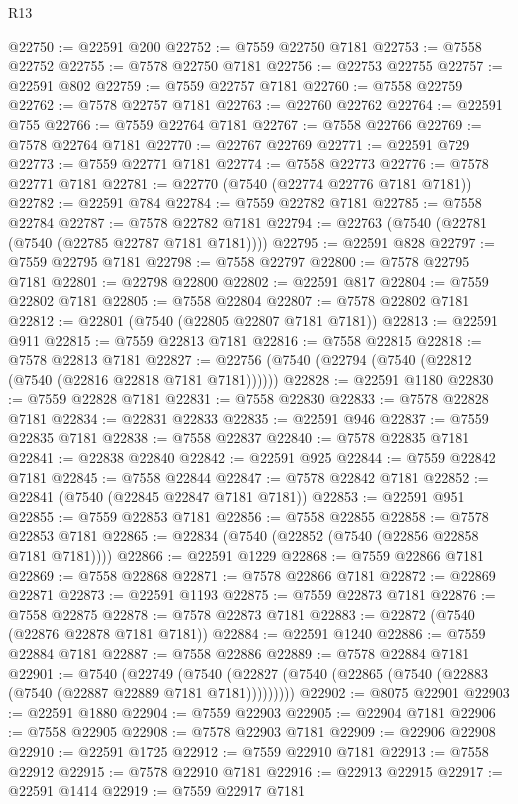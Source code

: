 \begin{lexlean}{R13}
\begin{coremodule}
@22750 := @22591 @200
@22752 := @7559 @22750 @7181
@22753 := @7558 @22752
@22755 := @7578 @22750 @7181
@22756 := @22753 @22755
@22757 := @22591 @802
@22759 := @7559 @22757 @7181
@22760 := @7558 @22759
@22762 := @7578 @22757 @7181
@22763 := @22760 @22762
@22764 := @22591 @755
@22766 := @7559 @22764 @7181
@22767 := @7558 @22766
@22769 := @7578 @22764 @7181
@22770 := @22767 @22769
@22771 := @22591 @729
@22773 := @7559 @22771 @7181
@22774 := @7558 @22773
@22776 := @7578 @22771 @7181
@22781 := @22770 (@7540 (@22774 @22776 @7181 @7181))
@22782 := @22591 @784
@22784 := @7559 @22782 @7181
@22785 := @7558 @22784
@22787 := @7578 @22782 @7181
@22794 := @22763 (@7540 (@22781 (@7540 (@22785 @22787 @7181 @7181))))
@22795 := @22591 @828
@22797 := @7559 @22795 @7181
@22798 := @7558 @22797
@22800 := @7578 @22795 @7181
@22801 := @22798 @22800
@22802 := @22591 @817
@22804 := @7559 @22802 @7181
@22805 := @7558 @22804
@22807 := @7578 @22802 @7181
@22812 := @22801 (@7540 (@22805 @22807 @7181 @7181))
@22813 := @22591 @911
@22815 := @7559 @22813 @7181
@22816 := @7558 @22815
@22818 := @7578 @22813 @7181
@22827 := @22756 (@7540 (@22794 (@7540 (@22812 (@7540 (@22816 @22818 @7181 @7181))))))
@22828 := @22591 @1180
@22830 := @7559 @22828 @7181
@22831 := @7558 @22830
@22833 := @7578 @22828 @7181
@22834 := @22831 @22833
@22835 := @22591 @946
@22837 := @7559 @22835 @7181
@22838 := @7558 @22837
@22840 := @7578 @22835 @7181
@22841 := @22838 @22840
@22842 := @22591 @925
@22844 := @7559 @22842 @7181
@22845 := @7558 @22844
@22847 := @7578 @22842 @7181
@22852 := @22841 (@7540 (@22845 @22847 @7181 @7181))
@22853 := @22591 @951
@22855 := @7559 @22853 @7181
@22856 := @7558 @22855
@22858 := @7578 @22853 @7181
@22865 := @22834 (@7540 (@22852 (@7540 (@22856 @22858 @7181 @7181))))
@22866 := @22591 @1229
@22868 := @7559 @22866 @7181
@22869 := @7558 @22868
@22871 := @7578 @22866 @7181
@22872 := @22869 @22871
@22873 := @22591 @1193
@22875 := @7559 @22873 @7181
@22876 := @7558 @22875
@22878 := @7578 @22873 @7181
@22883 := @22872 (@7540 (@22876 @22878 @7181 @7181))
@22884 := @22591 @1240
@22886 := @7559 @22884 @7181
@22887 := @7558 @22886
@22889 := @7578 @22884 @7181
@22901 := @7540
    (@22749 (@7540 (@22827 (@7540 (@22865 (@7540 (@22883 (@7540 (@22887 @22889 @7181 @7181)))))))))
@22902 := @8075 @22901
@22903 := @22591 @1880
@22904 := @7559 @22903
@22905 := @22904 @7181
@22906 := @7558 @22905
@22908 := @7578 @22903 @7181
@22909 := @22906 @22908
@22910 := @22591 @1725
@22912 := @7559 @22910 @7181
@22913 := @7558 @22912
@22915 := @7578 @22910 @7181
@22916 := @22913 @22915
@22917 := @22591 @1414
@22919 := @7559 @22917 @7181

\end{coremodule}
\end{lexlean}
